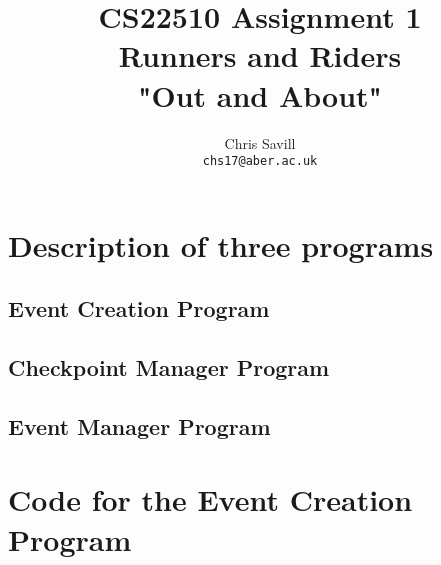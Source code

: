 \documentclass[a4paper,12pt]{article}
\title{CS22510 Assignment 1\\
Runners and Riders\\
"Out and About"}
\author{Chris Savill\\\texttt{chs17@aber.ac.uk}}
\begin{document}
\maketitle
\newpage
\tableofcontents
\newpage

\section{Description of three programs}

\subsection{Event Creation Program}

\subsection{Checkpoint Manager Program}

\subsection{Event Manager Program}

\section{Code for the Event Creation Program}








\end{document}

